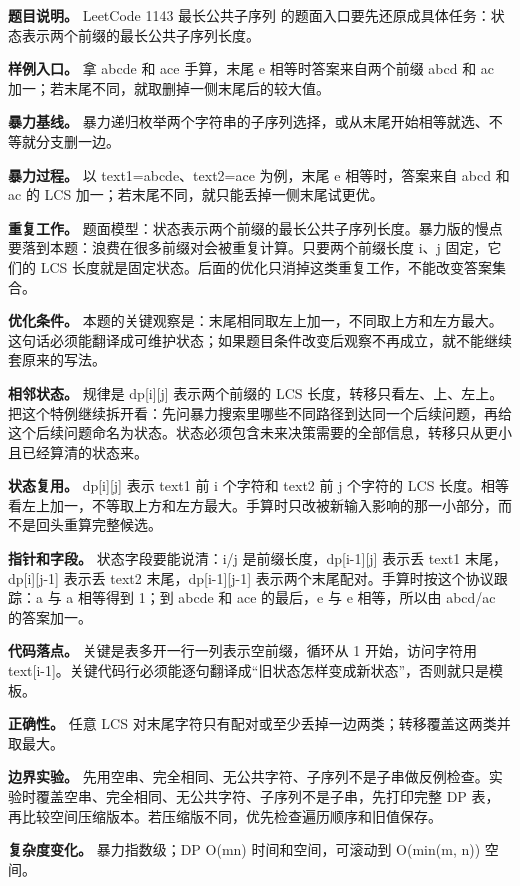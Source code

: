 \textbf{题目说明。} LeetCode 1143 最长公共子序列 的题面入口要先还原成具体任务：状态表示两个前缀的最长公共子序列长度。

\textbf{样例入口。} 拿 abcde 和 ace 手算，末尾 e 相等时答案来自两个前缀 abcd 和 ac 加一；若末尾不同，就取删掉一侧末尾后的较大值。

\textbf{暴力基线。} 暴力递归枚举两个字符串的子序列选择，或从末尾开始相等就选、不等就分支删一边。

\textbf{暴力过程。} 以 text1=abcde、text2=ace 为例，末尾 e 相等时，答案来自 abcd 和 ac 的 LCS 加一；若末尾不同，就只能丢掉一侧末尾试更优。

\textbf{重复工作。} 题面模型：状态表示两个前缀的最长公共子序列长度。暴力版的慢点要落到本题：浪费在很多前缀对会被重复计算。只要两个前缀长度 i、j 固定，它们的 LCS 长度就是固定状态。后面的优化只消掉这类重复工作，不能改变答案集合。

\textbf{优化条件。} 本题的关键观察是：末尾相同取左上加一，不同取上方和左方最大。这句话必须能翻译成可维护状态；如果题目条件改变后观察不再成立，就不能继续套原来的写法。

\textbf{相邻状态。} 规律是 dp[i][j] 表示两个前缀的 LCS 长度，转移只看左、上、左上。把这个特例继续拆开看：先问暴力搜索里哪些不同路径到达同一个后续问题，再给这个后续问题命名为状态。状态必须包含未来决策需要的全部信息，转移只从更小且已经算清的状态来。

\textbf{状态复用。} dp[i][j] 表示 text1 前 i 个字符和 text2 前 j 个字符的 LCS 长度。相等看左上加一，不等取上方和左方最大。手算时只改被新输入影响的那一小部分，而不是回头重算完整候选。

\textbf{指针和字段。} 状态字段要能说清：i/j 是前缀长度，dp[i-1][j] 表示丢 text1 末尾，dp[i][j-1] 表示丢 text2 末尾，dp[i-1][j-1] 表示两个末尾配对。手算时按这个协议跟踪：a 与 a 相等得到 1；到 abcde 和 ace 的最后，e 与 e 相等，所以由 abcd/ac 的答案加一。

\textbf{代码落点。} 关键是表多开一行一列表示空前缀，循环从 1 开始，访问字符用 text[i-1]。关键代码行必须能逐句翻译成“旧状态怎样变成新状态”，否则就只是模板。

\textbf{正确性。} 任意 LCS 对末尾字符只有配对或至少丢掉一边两类；转移覆盖这两类并取最大。

\textbf{边界实验。} 先用空串、完全相同、无公共字符、子序列不是子串做反例检查。实验时覆盖空串、完全相同、无公共字符、子序列不是子串，先打印完整 DP 表，再比较空间压缩版本。若压缩版不同，优先检查遍历顺序和旧值保存。

\textbf{复杂度变化。} 暴力指数级；DP O(mn) 时间和空间，可滚动到 O(min(m, n)) 空间。

